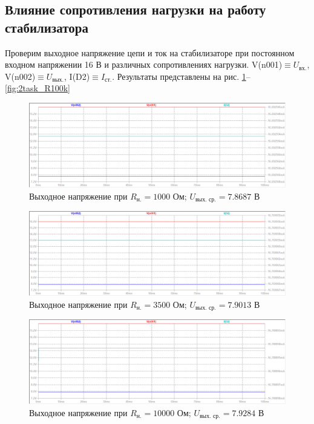 \documentclass[a4paper, 12pt]{article}
\begin{document}
    \subsection{Влияние сопротивления нагрузки на работу стабилизатора}
    Проверим выходное напряжение цепи и ток на стабилизаторе при постоянном
    входном напряжении 16 В и различных сопротивлениях нагрузки. V(n001)$\equiv U_{\text{вх.}}$,
    V(n002)$\equiv U_{\text{вых.}}$, I(D2)$\equiv I_{\text{ст.}}$. Результаты представлены на рис.
    \ref{fig:2task_R1k}--\ref{fig:2task_R100k}
    \begin{figure}[H]
        \centering
        \includegraphics[scale=0.46]{2task_R1k.png}
        \captionsetup{skip=0pt}
        \caption{Выходное напряжение при $R_{\text{н.}}=1000$ Ом; $U_{\text{вых. ср.}}=7.8687$ В}
        \label{fig:2task_R1k}
    \end{figure}
    \begin{figure}[H]
        \centering
        \includegraphics[scale=0.46]{2task_R3_5k.png}
        \captionsetup{skip=0pt}
        \caption{Выходное напряжение при $R_{\text{н.}}=3500$ Ом; $U_{\text{вых. ср.}}=7.9013$ В}
        \label{fig:2task_R3_5k}
    \end{figure}
    \begin{figure}[H]
        \centering
        \includegraphics[scale=0.46]{2task_R10k.png}
        \captionsetup{skip=0pt}
        \caption{Выходное напряжение при $R_{\text{н.}}=10000$ Ом; $U_{\text{вых. ср.}}=7.9284$ В}
        \label{fig:2task_R10k}
    \end{figure}
\end{document}
